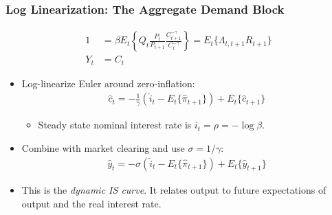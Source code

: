 \documentclass[english,xcolor=svgnames]{beamer}
\begin{document}

\begin{frame}
\frametitle{Log Linearization: The Aggregate Demand Block
}
\begin{align*}
	1&=\beta E_t\left\{Q_t \frac{P_t}{P_{t+1}} \frac{C_{t+1}^{-\gamma}}{C_{t}^{-\gamma}}\right\}=E_{t}\{\Lambda_{t,t+1}R_{t+1}\} \\
	Y_t&=C_t %
\end{align*}
\begin{itemize}
	\item Log-linearize Euler around zero-inflation:
	\begin{align*}
		\hat{c}_t=-\frac{1}{\gamma}\left(\hat{i}_t-E_t\{\hat{\pi}_{t+1}\}\right)+E_t\{\hat{c}_{t+1}\}
	\end{align*}
	\begin{itemize}
		\item Steady state nominal interest rate is $i_t = \rho = -\log \beta$.
	\end{itemize}
	\item Combine with market clearing and use $\sigma=1/\gamma$:
	\begin{align*}
		\hat{y}_t=-\sigma\left(\hat{i}_t-E_t\{\hat{\pi}_{t+1}\}\right)+E_t\{\hat{y}_{t+1}\}
	\end{align*}
	\item This is the \emph{dynamic IS curve}. It relates output to future expectations of output and the real interest rate.
\end{itemize}
\end{frame}
\end{document}
